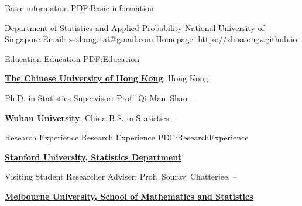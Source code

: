 \documentclass[letterpaper,MMMyyyy,nonstopmode]{simpleresumecv}
\newcommand{\CVAuthor}{Dr. Zhuo-Song Zhang}
\newcommand{\CVWebpage}{https://zhuosongz.github.io}
\begin{document}


\Title{\CVAuthor}


\begin{Body}



{Basic information}
{PDF:Basic information}

\BulletItem Department of Statistics and Applied Probability
\BulletItem National University of Singapore
\BulletItem Email: \href{mailto:zszhang.stat@gmail.com}
{zszhangstat@gmail.com}
\BulletItem Homepage: \href{\CVWebpage}\CVWebpage


\Section
{Education}
{Education}
{PDF:Education}

\Entry
\href{http://www.cuhk.edu.hk}
{\textbf{The Chinese University of Hong Kong}}, Hong Kong

\Gap
\BulletItem
Ph.D. in
\href{http://www.sta.cuhk.edu.hk}
{Statistics}
\SubBulletItem
Supervisor:
Prof.~Qi-Man~Shao.
\hfill
{} -- 
\begin{Detail}
\end{Detail}

\Entry
\href{http://www.whu.edu.cn}
{\textbf{Wuhan University}}, China
\Gap
\BulletItem
B.S. in Statistics.
\hfill
{} -- 




\Section
{Research Experience}
{Research Experience}
{PDF:ResearchExperience}

\Entry
\href{http://www.stanford.edu}
{\textbf{Stanford University,  Statistics Department}}

\Gap
\BulletItem
Visiting Student Researcher
\SubBulletItem
Adviser:
Prof.~Sourav~Chatterjee.
\hfill
{} --
\begin{Detail}

\end{Detail}
\Entry
\href{http://www.unimelb.edu.au}
{\textbf{Melbourne University,  School of Mathematics and Statistics}}


\end{Body}
\end{document}
